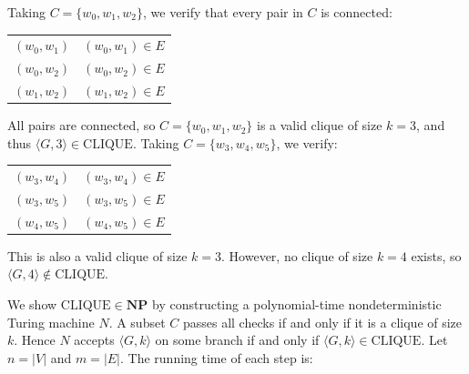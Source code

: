 \documentclass[12pt,a4paper,openany]{article}
\begin{document}
Taking $C = \{w_0, w_1, w_2\}$, we verify that every pair in $C$ is connected:

\begin{center}
\begin{tabular}{ll}
$(w_0, w_1)$ & $(w_0, w_1) \in E$ \\
$(w_0, w_2)$ & $(w_0, w_2) \in E$ \\
$(w_1, w_2)$ & $(w_1, w_2) \in E$ \\
\end{tabular}
\end{center}

All pairs are connected, so $C = \{w_0, w_1, w_2\}$ is a valid clique of size $k = 3$, and thus $\langle G, 3 \rangle \in \text{CLIQUE}$.
Taking $C = \{w_3, w_4, w_5\}$, we verify:

\begin{center}
\begin{tabular}{ll}
$(w_3, w_4)$ & $(w_3, w_4) \in E$ \\
$(w_3, w_5)$ & $(w_3, w_5) \in E$ \\
$(w_4, w_5)$ & $(w_4, w_5) \in E$ \\
\end{tabular}
\end{center}

This is also a valid clique of size $k = 3$. However, no clique of size $k = 4$ exists, so $\langle G, 4 \rangle \notin \text{CLIQUE}$.

\begin{center}
\end{center}

We show $\text{CLIQUE} \in \mathbf{NP}$ by constructing a polynomial-time nondeterministic Turing machine $N$.
A subset $C$ passes all checks if and only if it is a clique of size $k$. Hence $N$ accepts $\langle G, k \rangle$ on some branch if and only if $\langle G, k \rangle \in \text{CLIQUE}$.
Let $n = |V|$ and $m = |E|$. The running time of each step is:
\end{document}

